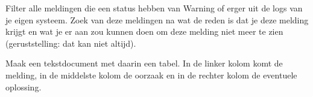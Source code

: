 Filter alle meldingen die een status hebben van Warning of erger uit de logs van je eigen systeem. Zoek van deze meldingen na wat de reden is dat je deze melding krijgt en wat je er aan zou kunnen doen om deze melding niet meer te zien (geruststelling: dat kan niet altijd).

Maak een tekstdocument met daarin een tabel. In de linker kolom komt de melding, in de middelste kolom de oorzaak en in de rechter kolom de eventuele oplossing.

